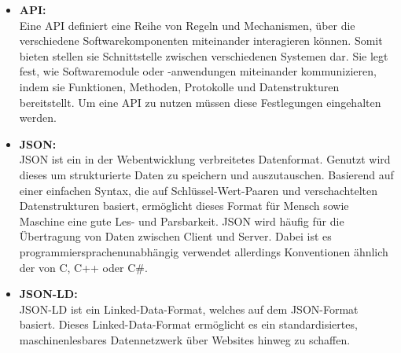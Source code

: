 \begin{itemize}
    \item \textbf{\acf{API}:} \\
    Eine \ac{API} definiert eine Reihe von Regeln und Mechanismen, über die verschiedene Softwarekomponenten miteinander interagieren können.
    Somit bieten stellen sie Schnittstelle zwischen verschiedenen Systemen dar.
    Sie legt fest, wie Softwaremodule oder -anwendungen miteinander kommunizieren, indem sie Funktionen, Methoden, Protokolle und Datenstrukturen bereitstellt.
    Um eine \ac{API} zu nutzen müssen diese Festlegungen eingehalten werden.
    
    
    \item \textbf{\ac{JSON}:} \\
    \ac{JSON} ist ein in der Webentwicklung verbreitetes Datenformat.
    Genutzt wird dieses um strukturierte Daten zu speichern und auszutauschen.
    Basierend auf einer einfachen Syntax, die auf Schlüssel-Wert-Paaren und verschachtelten Datenstrukturen basiert, ermöglicht dieses Format für Mensch sowie Maschine eine gute Les- und Parsbarkeit.
    \ac{JSON} wird häufig für die Übertragung von Daten zwischen Client und Server.
    Dabei ist es programmiersprachenunabhängig verwendet allerdings Konventionen ähnlich der von C, C++ oder C\#.

    \item \textbf{\ac{JSON-LD}:} \\
    \ac{JSON-LD} ist ein Linked-Data-Format, welches auf dem \ac{JSON}-Format basiert.
    Dieses Linked-Data-Format ermöglicht es ein standardisiertes, maschinenlesbares Datennetzwerk über Websites hinweg zu schaffen.
\end{itemize}